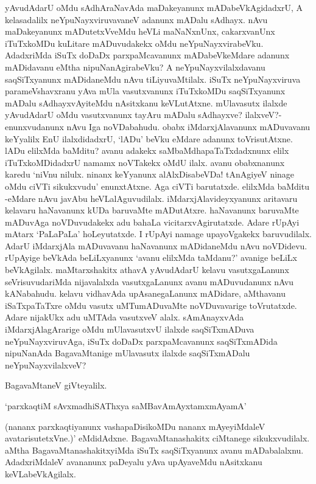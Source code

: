 yAvudAdarU oMdu sAdhAraNavAda maDakeyanunx mADabeVkAgidadxrU, A kelasadalilx neYpuNayxviruvavaneV adanunx mADalu sAdhayx. nAvu maDakeyanunx mADutetxVveMdu heVLi maNaNxnUnx, cakarxvanUnx iTuTxkoMDu kuLitare mADuvudakekx oMdu neYpuNayxvirabeVku. AdadxriMda iSuTx doDaDx parxpaMcavanunx mADabeVkeMdare adanunx mADidavanu eMtha nipuNanAgirabeVku? A neYpuNayxvilalxdavanu saqSiTxyanunx mADidaneMdu nAvu tiLiyuvaMtilalx. iSuTx neYpuNayxviruva parameVshavxranu yAva mUla vasutxvanunx iTuTxkoMDu saqSiTxyanunx mADalu sAdhayxvAyiteMdu nAsitxkanu keVLutAtxne. mUlavasutx ilalxde yAvudAdarU oMdu vasutxvanunx tayAru mADalu sAdhayxve? ilalxveV?- enunxvudanunx nAvu Iga noVDabahudu. obabx iMdarxjAlavanunx mADuvavanu keYyalilx EnU ilalxdidadxrU, `lADu' beVku eMdare adanunx toVrisutAtxne. lADu elilxMda baMditu? avanu adakekx saMbaMdhapaTaTxdadxnunx elilx iTuTxkoMDidadxrU namamx noVTakekx oMdU ilalx. avanu obabxnanunx karedu `niVnu nilulx. ninanx keYyanunx alAlxDisabeVDa! tAnAgiyeV ninage oMdu ciVTi sikukxvudu' enunxtAtxne. Aga ciVTi barutatxde. elilxMda baMditu -eMdare nAvu javAbu heVLalAguvudilalx. iMdarxjAlavideyxyanunx aritavaru kelavaru haNavanunx kUDa baruvaMte mADutAtxre. haNavanunx baruvaMte mADuvAga noVDuvudakekx adu bahaLa vicitarxvAgirutatxde. Adare rUpAyi mAtarx `PaLaPaLa' hoLeyutatxde. I rUpAyi namage upayoVgakekx baruvudilalx. AdarU iMdarxjAla mADuvavanu haNavanunx mADidaneMdu nAvu noVDidevu. rUpAyige beVkAda beLiLxyanunx `avanu elilxMda taMdanu?' avanige beLiLx beVkAgilalx. maMtarxshakitx athavA yAvudAdarU kelavu vasutxgaLanunx seVrisuvudariMda nijavalalxda vasutxgaLanunx avanu mADuvudanunx nAvu kANabahudu. kelavu vidhavAda upAsanegaLanunx mADidare, aMthavanu iSaTxpaTaTxre oMdu vasutx uMTumADuvaMte noVDuvavarige toVrutatxde. Adare nijakUkx adu uMTAda vasutxveV alalx. sAmAnayxvAda iMdarxjAlagArarige oMdu mUlavasutxvU ilalxde saqSiTxmADuva neYpuNayxviruvAga, iSuTx doDaDx parxpaMcavanunx saqSiTxmADida nipuNanAda BagavaMtanige mUlavasutx ilalxde saqSiTxmADalu neYpuNayxvilalxveV?

BagavaMtaneV giVteyalilx.

\begin{shloka}
`parxkaqtiM sAvxmadhiSAThxya saMBavAmAyxtamxmAyamA'
\end{shloka}

(nananx parxkaqtiyanunx vashapaDisikoMDu nananx mAyeyiMdaleV avatarisutetxVne.)' eMdidAdxne. BagavaMtanashakitx ciMtanege sikukxvudilalx. aMtha BagavaMtanashakitxyiMda iSuTx saqSiTxyanunx avanu mADabalalxnu. AdadxriMdaleV avananunx paDeyalu yAva upAyaveMdu nAsitxkanu keVLabeVkAgilalx.

